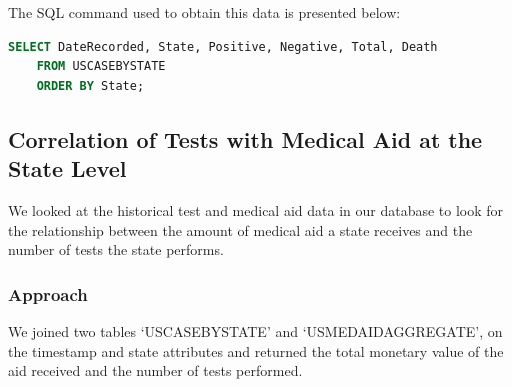 \documentclass[11pt]{article}
\begin{document}
\noindent
The SQL command used to obtain this data is presented below:
\begin{lstlisting}[language=SQL,
        deletekeywords={IDENTITY,INT},
        morekeywords={clustered},    
        framesep=10pt,
        framextopmargin=10pt]
    SELECT DateRecorded, State, Positive, Negative, Total, Death 
    FROM USCASEBYSTATE
    ORDER BY State;\end{lstlisting}
    
\pagebreak

\subsection{Correlation of Tests with Medical Aid at the State Level}
\noindent
We looked at the historical test and medical aid data in our database to look for the relationship between the amount of medical aid a state receives and the number of tests the state performs. 

\subsubsection{Approach}
We joined two tables `USCASEBYSTATE' and `USMEDAIDAGGREGATE', on the timestamp and state attributes and returned the total monetary value of the aid received and the number of tests performed. 


\end{document}
